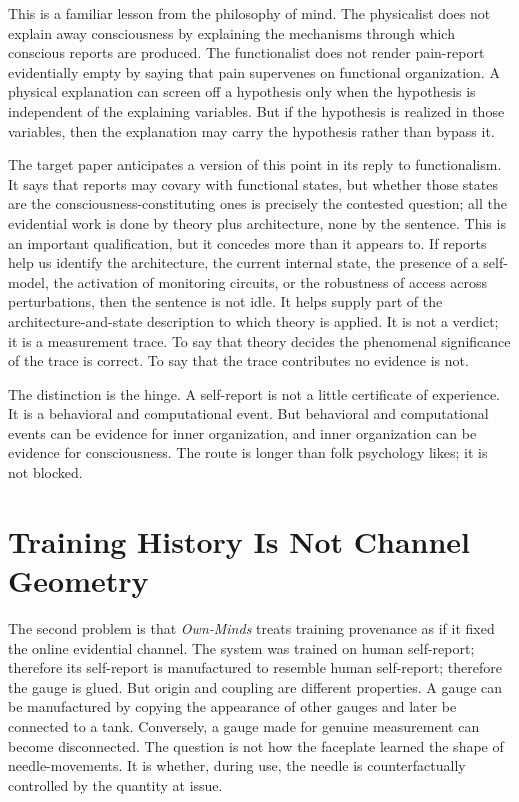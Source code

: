 \documentclass[11pt]{article}
\begin{document}
This is a familiar lesson from the philosophy of mind. The physicalist does not explain away consciousness by explaining the mechanisms through which conscious reports are produced. The functionalist does not render pain-report evidentially empty by saying that pain supervenes on functional organization. A physical explanation can screen off a hypothesis only when the hypothesis is independent of the explaining variables. But if the hypothesis is realized in those variables, then the explanation may carry the hypothesis rather than bypass it.

The target paper anticipates a version of this point in its reply to functionalism. It says that reports may covary with functional states, but whether those states are the consciousness-constituting ones is precisely the contested question; all the evidential work is done by theory plus architecture, none by the sentence. This is an important qualification, but it concedes more than it appears to. If reports help us identify the architecture, the current internal state, the presence of a self-model, the activation of monitoring circuits, or the robustness of access across perturbations, then the sentence is not idle. It helps supply part of the architecture-and-state description to which theory is applied. It is not a verdict; it is a measurement trace. To say that theory decides the phenomenal significance of the trace is correct. To say that the trace contributes no evidence is not.

The distinction is the hinge. A self-report is not a little certificate of experience. It is a behavioral and computational event. But behavioral and computational events can be evidence for inner organization, and inner organization can be evidence for consciousness. The route is longer than folk psychology likes; it is not blocked.

\section{Training History Is Not Channel Geometry}

The second problem is that \textit{Own-Minds} treats training provenance as if it fixed the online evidential channel. The system was trained on human self-report; therefore its self-report is manufactured to resemble human self-report; therefore the gauge is glued. But origin and coupling are different properties. A gauge can be manufactured by copying the appearance of other gauges and later be connected to a tank. Conversely, a gauge made for genuine measurement can become disconnected. The question is not how the faceplate learned the shape of needle-movements. It is whether, during use, the needle is counterfactually controlled by the quantity at issue.
\end{document}
